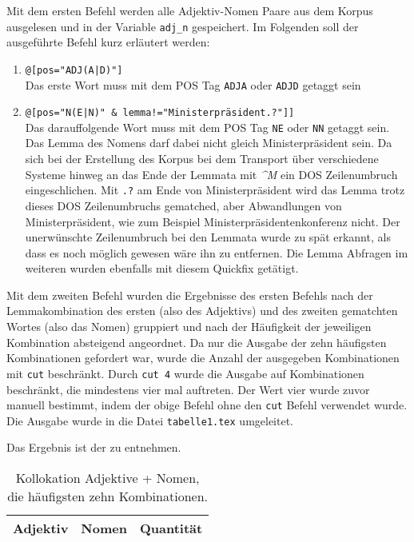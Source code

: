 \documentclass[%
	type=document,%
  	style=article,%
  	media=print,
  	pages=oneside,%
  	prefixLecturer=Dozenten:,
  	author=multiple,
]{unihildesheim} %
\begin{document}
Mit dem ersten Befehl werden alle Adjektiv-Nomen Paare aus dem Korpus ausgelesen
und in der Variable \texttt{adj\_n} gespeichert. Im Folgenden soll der
ausgeführte Befehl kurz erläutert werden:
\begin{enumerate}
  \item \texttt{@[pos="ADJ(A|D)"]} \\
			Das erste Wort muss mit dem POS Tag \texttt{ADJA} oder \texttt{ADJD} getaggt
			sein
  \item \texttt{@[pos="N(E|N)" \& lemma!="Ministerpräsident.?"]]} \\
			Das darauffolgende Wort muss mit dem POS Tag \texttt{NE} oder \texttt{NN}
			getaggt sein. Das Lemma des Nomens darf dabei nicht gleich
			Ministerpräsident sein. Da sich bei der Erstellung des Korpus bei dem
			Transport über verschiedene Systeme hinweg an das Ende der Lemmata mit
			\textit{\textasciicircum M} ein DOS Zeilenumbruch eingeschlichen. Mit
			\texttt{.?} am Ende von Ministerpräsident wird das Lemma trotz dieses DOS
			Zeilenumbruchs gematched, aber Abwandlungen von Ministerpräsident, wie zum
			Beispiel Ministerpräsidentenkonferenz nicht. Der unerwünschte
			Zeilenumbruch bei den Lemmata wurde zu spät erkannt, als dass es noch
			möglich gewesen wäre ihn zu entfernen. Die Lemma Abfragen im weiteren wurden
			ebenfalls mit diesem Quickfix getätigt.
\end{enumerate}

Mit dem zweiten Befehl wurden die Ergebnisse des ersten Befehls nach der
Lemmakombination des ersten (also des Adjektivs) und des zweiten gematchten
Wortes (also das Nomen) gruppiert und nach der Häufigkeit der jeweiligen
Kombination absteigend angeordnet. Da nur die Ausgabe der zehn häufigsten
Kombinationen gefordert war, wurde die Anzahl der ausgegeben Kombinationen
mit \texttt{cut} beschränkt. Durch \texttt{cut 4} wurde die Ausgabe auf
Kombinationen beschränkt, die mindestens vier mal auftreten. Der Wert vier wurde zuvor manuell
bestimmt, indem der obige Befehl ohne den \texttt{cut} Befehl verwendet wurde.
Die Ausgabe wurde in die Datei \texttt{tabelle1.tex} umgeleitet.

Das Ergebnis ist der  zu entnehmen.

\begin{table}[htpb]\label{t}
	\center
	\begin{tabularx}{0.6\textwidth}{llr}
		\toprule
		\textbf{Adjektiv} & \textbf{Nomen} & \textbf{Quantität}\\
		\midrule
		
		\bottomrule
	\end{tabularx}
	\caption{Kollokation Adjektive + Nomen, die häufigsten zehn Kombinationen.}
	\label{tab:adjektive_nomina}
\end{table}
\end{document}

